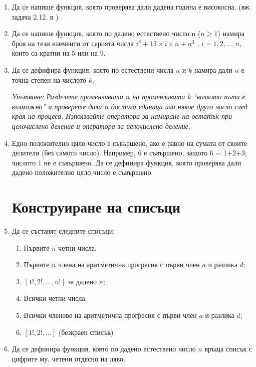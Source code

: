\begin{enumerate}
  \item Да се напише функция, която проверява дали дадена година е високосна. (вж. задача 2.12. в \cite{sbornik})
  
  \item Да се напише функция, която по дадено естествено число n ($n \geq 1$) намира броя на тези елементи от серията числа $i^3 + 13 \times i \times n + n^3$ , $i = 1, 2, ..., n$, които са кратни на 5 или на 9.

  \item Да се дефифира функция, която по естествени числа $n$ и $k$ намира дали $n$ е точна степен на числото $k$.

  \textit{Упътване: Разделете променливата $n$ на променливата $k$ ``колкото пъти е възможно'' и проверете дали $n$ достига единица или някое друго число след края на процеса. Използвайте оператора за намиране на остатък при целочислено деление и оператора за целочислено деление.}

  \item Едно положително цяло число е съвършено, ако е равно на сумата от своите делители (без самото число). Например, 6 е съвършено, защото 6 = 1+2+3; числото 1 не е съвършено. Да се дефинира функция, която проверява дали дадено положително цяло число е съвършено.


  \section {Конструиране на списъци}

  \item Да се съставят следните списъци:
	\renewcommand{\theenumii}{\Alph{enumii}}

	\begin{enumerate}[label=\alph*)]%
			 \item Първите $n$ четни числа;
			 \item Първите $n$ члена на аритметична прогресия с първи член $a$ и разлика $d$;
			 \item $[1!, 2!, ..., n!]$ за дадено $n$;
			 \item Всички четни числа;
			 \item Всички членове на аритметична прогресия с първи член $a$ и разлика $d$;
			 \item $[1!, 2!, ...]$ (безкраен списък)
  \end{enumerate}

  \item Да се дефинира функция, която по дадено естествено число $n$ връща списък с цифрите му, четени отдясно на ляво.


\end{enumerate}
